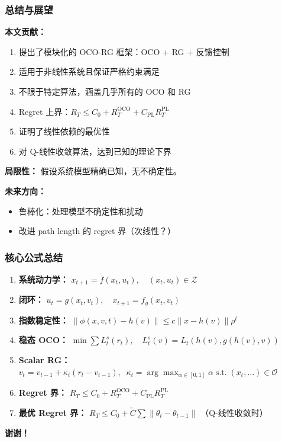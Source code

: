 \documentclass{ltx-talk}
\begin{document}
\begin{frame}
\frametitle{总结与展望}

\textbf{本文贡献：}
\begin{enumerate}
    \item 提出了\textcolor{myblue}{模块化的 OCO-RG 框架}：OCO + RG + 反馈控制
    \item 适用于\textcolor{myred}{非线性系统}且保证\textcolor{myred}{严格约束满足}
    \item 不限于特定算法，涵盖几乎所有的 OCO 和 RG
    \item Regret 上界：$R_T \le C_0 + R_T^{\text{OCO}} + C_{\text{PL}} R_T^{\text{PL}}$
    \item 证明了线性依赖的\textcolor{myred}{最优性}
    \item 对 Q-线性收敛算法，达到已知的理论下界
\end{enumerate}

\textbf{局限性：} 假设系统模型精确已知，无不确定性。

\textbf{未来方向：}
\begin{itemize}
    \item 鲁棒化：处理模型不确定性和扰动
    \item 改进 path length 的 regret 界（次线性？）
\end{itemize}
\end{frame}

\begin{frame}
\frametitle{核心公式总结}

\begin{enumerate}
    \item \textbf{系统动力学：} $x_{t+1} = f(x_t, u_t), \quad (x_t, u_t) \in \mathcal{Z}$

    \item \textbf{闭环：} $u_t = g(x_t, v_t), \quad x_{t+1} = f_g(x_t, v_t)$

    \item \textbf{指数稳定性：} $\|\phi(x,v,t) - h(v)\| \le c\|x - h(v)\|\rho^t$

    \item \textbf{稳态 OCO：} $\min \sum L_t^s(r_t), \quad L_t^s(v) = L_t(h(v), g(h(v), v))$

    \item \textbf{Scalar RG：} $v_t = v_{t-1} + \kappa_t(r_t - v_{t-1}), \;\; \kappa_t = \arg\max_{\alpha \in [0,1]} \alpha \; \text{s.t.} \; (x_t, \ldots) \in \mathcal{O}$

    \item \textbf{Regret 界：} $R_T \le C_0 + R_T^{\text{OCO}} + C_{\text{PL}}R_T^{\text{PL}}$

    \item \textbf{最优 Regret 界：} $R_T \le C_0 + \tilde{C}\sum \|\theta_t - \theta_{t-1}\|$ （Q-线性收敛时）
\end{enumerate}

\vspace{3mm}
\begin{center}
\textcolor{myblue}{\textbf{谢谢！}}

\end{center}
\end{frame}
\end{document}
